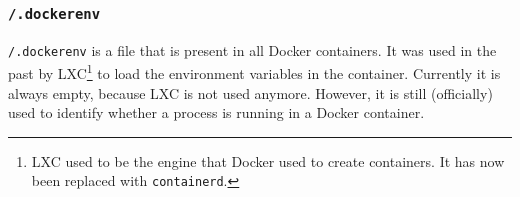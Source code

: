 \subsubsection{\texorpdfstring{\lstinline{/.dockerenv}}{/.dockerenv}}
\lstinline{/.dockerenv} is a file that is present in all Docker containers. It was used in the past by LXC\footnote{LXC used to be the engine that Docker used to create containers. It has now been replaced with \lstinline{containerd}.} to load the environment variables in the container. Currently it is always empty, because LXC is not used anymore. However, it is still (officially) used to identify whether a process is running in a Docker container\cite{Metasploit-Linux-Gather-Container-Detection}\cite{Removed-Dockerinit-Reference}.
